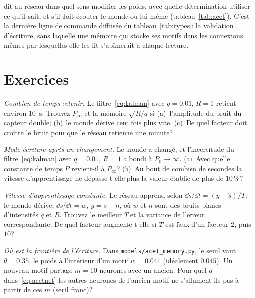  dit au réseau dans quel sens modifier les poids,  avec quelle détermination utiliser ce qu'il sait, et  s'il doit écouter le monde ou lui-même (tableau~\ref{tab:acet}). C'est la dernière ligne de commande diffusée du tableau~\ref{tab:types}: la validation d'écriture, sans laquelle une mémoire qui stocke ses motifs dans les connexions mêmes par lesquelles elle les lit s'abîmerait à chaque lecture.

\section{Exercices}

\begin{exercise}[\lvlA]
\label{ex:09:1}
\emph{Combien de temps retenir.} Le filtre~\eqref{eq:kalman} avec $q=0.01$, $R=1$ retient environ $10$~s. Trouvez $P_\infty$ et la mémoire $\sqrt{R/q}$ si (a)~l'amplitude du bruit du capteur double; (b)~le monde dérive cent fois plus vite. (c)~De quel facteur doit croître le bruit pour que le réseau retienne une minute?
\end{exercise}

\begin{exercise}[\lvlB]
\label{ex:09:2}
\emph{Mode écriture après un changement.} Le monde a changé, et l'incertitude du filtre~\eqref{eq:kalman} avec $q=0.01$, $R=1$ a bondi à $P_0\to\infty$. (a)~Avec quelle constante de temps $P$ revient-il à $P_\infty$? (b)~Au bout de combien de secondes la vitesse d'apprentissage ne dépasse-t-elle plus la valeur établie de plus de $10\,\%$?
\end{exercise}

\begin{exercise}[\lvlB]
\label{ex:09:3}
\emph{Vitesse d'apprentissage constante.} Le réseau apprend selon $\dd\hat s/\dd t=(y-\hat s)/T$; le monde dérive, $\dd s/\dd t=w$, $y=s+n$, où $w$ et $n$ sont des bruits blancs d'intensités $q$ et $R$. Trouvez le meilleur $T$ et la variance de l'erreur correspondante. De quel facteur augmente-t-elle si $T$ est faux d'un facteur $2$, puis $10$?
\end{exercise}

\begin{exercise}[\lvlB]
\label{ex:09:4}
\emph{Où est la frontière de l'écriture.} Dans \texttt{models/\allowbreak acet\_memory.py}, le seuil vaut $\theta=0.35$, le poids à l'intérieur d'un motif $w=0.041$ (idéalement $0.045$). Un nouveau motif partage $m=10$ neurones avec un ancien. Pour quel $a$ dans~\eqref{eq:acetnet} les autres neurones de l'ancien motif ne s'allument-ils pas à partir de ces $m$ (seuil franc)?
\end{exercise}

